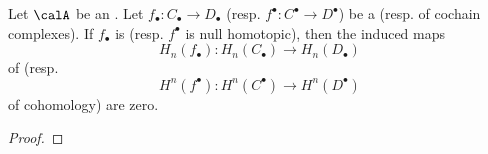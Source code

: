 \begin{lemma} \label{lemma:null_homotopic_morphism_of_chain_complexes_in_an_abelian_category_yields_zero_homology_maps}
    Let $\calA$ be an . Let $f_\bullet: C_\bullet \to D_\bullet$ (resp. $f^\bullet: C^\bullet \to D^\bullet$) be a  (resp. of cochain complexes). 
    If $f_\bullet$ is  (resp. $f^\bullet$ is null homotopic), then the induced maps 
    $$H_n(f_\bullet): H_n(C_\bullet) \to H_n(D_\bullet)$$
    of  
    (resp. 
    $$H^n(f^\bullet): H^n(C^\bullet) \to H^n(D^\bullet)$$
    of cohomology)
    are zero. 
\end{lemma}

\begin{proof}
    \TODO{}
\end{proof}